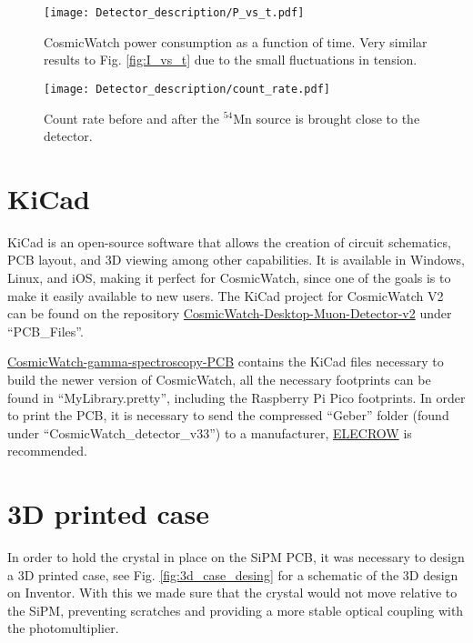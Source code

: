 \begin{figure}[H]
  \centering
  \texttt{[image: Detector\_description/P\_vs\_t.pdf]}
  \caption{CosmicWatch power consumption as a function of time. Very similar results to Fig. \ref{fig:I_vs_t} due to the small fluctuations in tension.}
  \label{fig:P_vs_t}
\end{figure}

\begin{figure}[H]
  \centering
  \texttt{[image: Detector\_description/count\_rate.pdf]}
  \caption{Count rate before and after the $^{54}$Mn source is brought close to the detector.}
  \label{fig:count_rate_for_power}
\end{figure}

\section{KiCad}

KiCad is an open-source software that allows the creation of circuit schematics, PCB layout, and 3D viewing among other capabilities. It is available in Windows, Linux, and iOS, making it perfect for CosmicWatch, since one of the goals is to make it easily available to new users. The KiCad project for CosmicWatch V2 can be found on the repository \href{https://github.com/spenceraxani/CosmicWatch-Desktop-Muon-Detector-v2}{CosmicWatch-Desktop-Muon-Detector-v2} under ``PCB\_Files''.

\href{https://github.com/anvargasl/CosmicWatch-gamma-spectroscopy-PCB}{CosmicWatch-gamma-spectroscopy-PCB} contains the KiCad files necessary to build the newer version of CosmicWatch, all the necessary footprints can be found in ``MyLibrary.pretty'', including the Raspberry Pi Pico footprints. In order to print the PCB, it is necessary to send the compressed ``Geber'' folder (found under ``CosmicWatch\_detector\_v33'') to a manufacturer, \href{https://www.elecrow.com/pcb-manufacturing.html}{ELECROW} is recommended.

\section{3D printed case}

In order to hold the crystal in place on the SiPM PCB, it was necessary to design a 3D printed case, see Fig. \ref{fig:3d_case_desing} for a schematic of the 3D design on Inventor. With this we made sure that the crystal would not move relative to the SiPM, preventing scratches and providing a more stable optical coupling with the photomultiplier.

